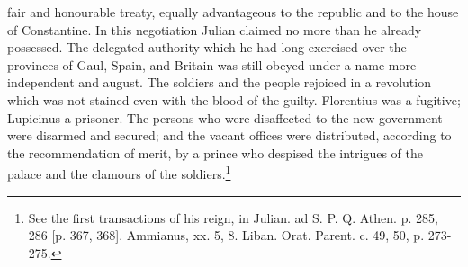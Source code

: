 fair and honourable treaty, equally advantageous to the republic and to the house of Constantine. In this negotiation Julian claimed no more than he already possessed. The delegated authority which he had long exercised over the provinces of Gaul, Spain, and Britain was still obeyed under a name more independent and august. The soldiers and the people rejoiced in a revolution which was not stained even with the blood of the guilty. Florentius was a fugitive; Lupicinus a prisoner. The persons who were disaffected to the new government were disarmed and secured; and the vacant offices were distributed, according to the recommendation of merit, by a prince who despised the intrigues of the palace and the clamours of the soldiers.\footnote{See the first transactions of his reign, in Julian. ad S. P. Q. Athen. p. 285, 286 [p. 367, 368]. Ammianus, xx. 5, 8. Liban. Orat. Parent. c. 49, 50, p. 273-275.}

